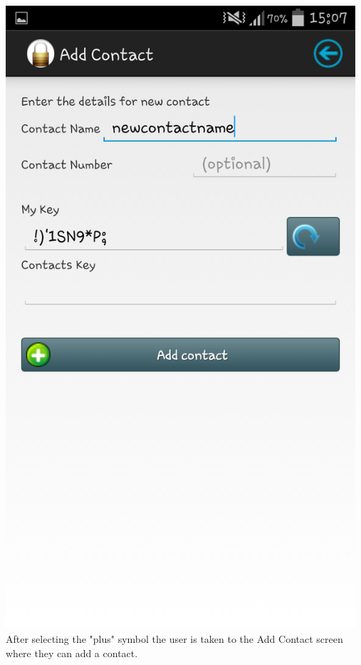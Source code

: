 \begin{center}
 \includegraphics[width=13cm]{screenshots/normal/4_AddContact.png}
 After selecting the "plus" symbol the user is taken to the Add Contact screen where they can add a contact.
\end{center}
